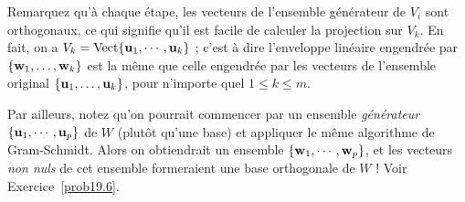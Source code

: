 Remarquez qu'à chaque étape, les vecteurs de l'ensemble g\'en\'erateur de $V_i$ sont orthogonaux, ce qui signifie qu'il est facile de calculer la projection sur
$V_k$.  En fait, on a $V_k = \textrm{Vect}\{\mathbf{u}_1 , \cdots, \mathbf{u}_k\}$ ; c'est à dire l'enveloppe lin\'eaire engendr\'ee par $\{\mathbf{w}_1, \dots, \mathbf{w}_k\}$ est la même que celle engendr\'ee par les vecteurs de l'ensemble original $\{\mathbf{u}_1, \dots, \mathbf{u}_k\}$, pour n'importe quel $1\leq k \leq m$.

\medskip
Par ailleurs, notez qu'on pourrait commencer par un  ensemble \emph{g\'en\'erateur} $\{\mathbf{u}_1,\cdots, \mathbf{u}_p\}$ de $W$ (plutôt qu'une base) et appliquer le même algorithme de Gram-Schmidt. Alors on obtiendrait un ensemble $\{\mathbf{w}_1,\cdots,\mathbf{w}_p\}$, et les  vecteurs {\it non nuls} de cet ensemble formeraient une base orthogonale de $W$ ! Voir Exercice~\ref{prob19.6}.

